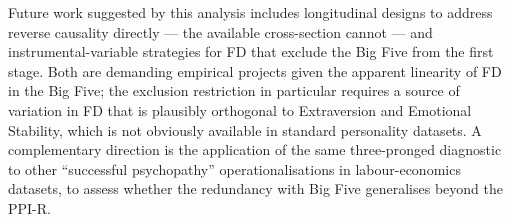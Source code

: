 \documentclass[11pt,a4paper]{article}
\begin{document}
Future work suggested by this analysis includes longitudinal designs
to address reverse causality directly --- the available cross-section
cannot --- and instrumental-variable strategies for FD that exclude
the Big Five from the first stage. Both are demanding empirical
projects given the apparent linearity of FD in the Big Five; the
exclusion restriction in particular requires a source of variation in
FD that is plausibly orthogonal to Extraversion and Emotional
Stability, which is not obviously available in standard personality
datasets. A complementary direction is the application of the same
three-pronged diagnostic to other ``successful psychopathy''
operationalisations in labour-economics datasets, to assess whether
the redundancy with Big Five generalises beyond the PPI-R.


\end{document}
